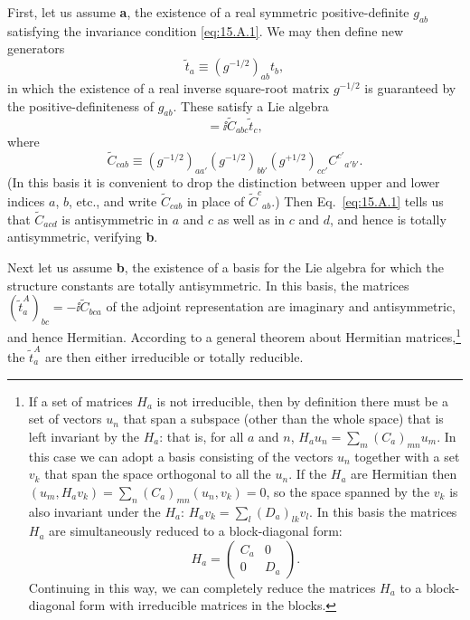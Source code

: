 First, let us assume \textbf{a}, the existence of a real symmetric positive-definite $g_{ab}$ satisfying the invariance condition \eqref{eq:15.A.1}. We may then define new generators
\begin{equation}
 \widetilde t_a\equiv(g^{-1/2})_{ab}t_b,
 \tag{15.A.3}\label{eq:15.A.3}
\end{equation}
in which the existence of a real inverse square-root matrix $g^{-1/2}$ is guaranteed by the positive-definiteness of $g_{ab}$. These satisfy a Lie algebra
\begin{equation}
 [\widetilde t_a,\widetilde t_b]
 =\ii\widetilde C_{abc}\widetilde t_c,
 \tag{15.A.4}\label{eq:15.A.4}
\end{equation}
where
\begin{equation}
 \widetilde C_{cab}
 \equiv(g^{-1/2})_{aa'}(g^{-1/2})_{bb'}
 (g^{+1/2})_{cc'}C^{c'}{}_{a'b'}.
 \tag{15.A.5}\label{eq:15.A.5}
\end{equation}
(In this basis it is convenient to drop the distinction between upper and lower indices $a$, $b$, etc., and write $\widetilde C_{cab}$ in place of $\widetilde C^c{}_{ab}$.) Then Eq.~\eqref{eq:15.A.1} tells us that $\widetilde C_{acd}$ is antisymmetric in $a$ and $c$ as well as in $c$ and $d$, and hence is totally antisymmetric, verifying \textbf{b}.

Next let us assume \textbf{b}, the existence of a basis for the Lie algebra for which the structure constants are totally antisymmetric. In this basis, the matrices $(\widetilde t^A_a)_{bc}=-\ii\widetilde C_{bca}$ of the adjoint representation are imaginary and antisymmetric, and hence Hermitian. According to a general theorem about Hermitian matrices,\footnote{If a set of matrices $H_a$ is not irreducible, then by definition there must be a set of vectors $u_n$ that span a subspace (other than the whole space) that is left invariant by the $H_a$: that is, for all $a$ and $n$, $H_a u_n=\sum_m(C_a)_{mn}u_m$. In this case we can adopt a basis consisting of the vectors $u_n$ together with a set $v_k$ that span the space orthogonal to all the $u_n$. If the $H_a$ are Hermitian then $(u_m,H_a v_k)=\sum_n(C_a)_{mn}(u_n,v_k)=0$, so the space spanned by the $v_k$ is also invariant under the $H_a$: $H_a v_k=\sum_l(D_a)_{lk}v_l$. In this basis the matrices $H_a$ are simultaneously reduced to a block-diagonal form:
\[
 H_a=\begin{pmatrix}C_a&0\\0&D_a\end{pmatrix}.
\]
Continuing in this way, we can completely reduce the matrices $H_a$ to a block-diagonal form with irreducible matrices in the blocks.} the $\widetilde t^A_a$ are then either irreducible or totally reducible.

